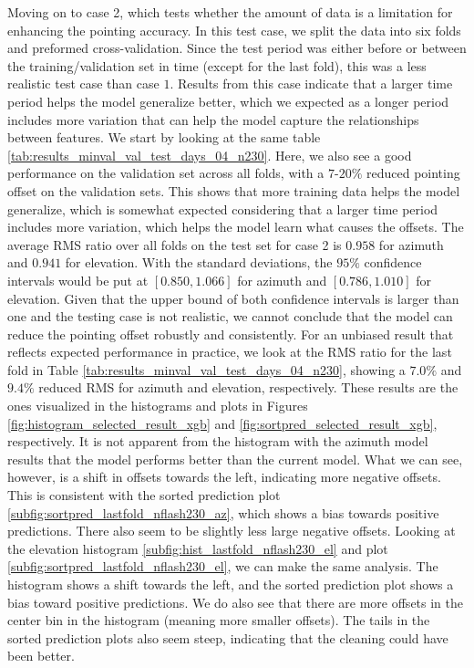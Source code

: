 Moving on to case 2, which tests whether the amount of data is a limitation for enhancing the pointing accuracy.
In this test case, we split the data into six folds and preformed cross-validation.
Since the test period was either before or between the training/validation set in time (except for the last fold), this was a less realistic test case than case $1$.
Results from this case indicate that a larger time period helps the model generalize better, which we expected as a longer period includes more variation that can help the model capture the relationships between features.
We start by looking at the same table \ref{tab:results_minval_val_test_days_04_n230}.
Here, we also see a good performance on the validation set across all folds, with a $7$-$20\%$ reduced pointing offset on the validation sets.
This shows that more training data helps the model generalize, which is somewhat expected considering that a larger time period includes more variation,
which helps the model learn what causes the offsets.
The average RMS ratio over all folds on the test set for case 2 is $0.958$ for azimuth and $0.941$ for elevation.
With the standard deviations, the $95\%$ confidence intervals would be put at $[0.850, 1.066]$ for azimuth and $[0.786, 1.010]$ for elevation.
Given that the upper bound of both confidence intervals is larger than one and the testing case is not realistic, we cannot conclude that the model can reduce the pointing offset robustly and consistently.
For an unbiased result that reflects expected performance in practice, we look at the RMS ratio for the last fold in Table \ref{tab:results_minval_val_test_days_04_n230},
showing a $7.0\%$ and $9.4\%$ reduced RMS for azimuth and elevation, respectively.
These results are the ones visualized in the histograms and plots in Figures \ref{fig:histogram_selected_result_xgb} and \ref{fig:sortpred_selected_result_xgb}, respectively.
It is not apparent from the histogram with the azimuth model results that the model performs better than the current model.
What we can see, however, is a shift in offsets towards the left, indicating more negative offsets.
This is consistent with the sorted prediction plot \ref{subfig:sortpred_lastfold_nflash230_az}, which shows a bias towards positive predictions.
There also seem to be slightly less large negative offsets.
Looking at the elevation histogram \ref{subfig:hist_lastfold_nflash230_el} and plot \ref{subfig:sortpred_lastfold_nflash230_el}, we can make the same analysis.
The histogram shows a shift towards the left, and the sorted prediction plot shows a bias toward positive predictions.
We do also see that there are more offsets in the center bin in the histogram (meaning more smaller offsets).
The tails in the sorted prediction plots also seem steep, indicating that the cleaning could have been better.\\


